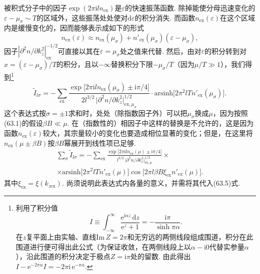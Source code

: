 被积式分子中的因子$\exp(2\pi\mathrm{i}ln_{\mathrm{ex}})$是$\varepsilon$的快速振荡函数. 除掉能使分母迅速变化的$\varepsilon-\mu_\sigma\sim T$的区域外，这些振荡处处使对$\mathrm{d}\varepsilon$的积分消失. 而函数$n_{\mathrm{ex}}(\varepsilon)$在这个区域内是缓慢变化的，因而能够表示成如下的形式
\begin{equation*}
n_{\mathrm{ex}}(\varepsilon)\approx n_{\mathrm{ex}}(\mu_\sigma)
+n'_{\mathrm{ex}}(\mu_\sigma)(\varepsilon-\mu_\sigma),
\end{equation*}
因子$|\partial^2 n/\partial k_z^2|_{\mathrm{ex}}^{-1/2}$可直接以其在$\varepsilon=\mu_\sigma$处之值来代替. 然后，由对$\varepsilon$的积分转到对$x=(\varepsilon-\mu_\sigma)/T$的积分，且以$-\infty$替换积分下限$-\mu_\sigma/T$（因为$\mu/T\gg1$），我们得到\footnote{利用了积分值
\begin{equation*}
 I\equiv\int_{-\infty}^{\infty}\frac{\mathrm e^{\mathrm i\alpha z}\,\mathrm dz}{\mathrm e^{z}+1}=-\frac{\mathrm i\pi}{\sinh\pi\alpha}.
\end{equation*}
在$z$复平面上由实轴、直线$\mathrm{Im}\,Z=2\pi$和无穷远的两侧线段组成围道，积分在此围道进行便可得出此公式（为保证收敛，在两侧线段上以$\alpha-\mathrm i0$代替实参量$\alpha$），沿此围道的积分决定于极点$Z=\mathrm i\pi$处的留数. 由此得出$I-\mathrm e^{-2\pi\alpha}I=-2\pi\mathrm i\,\mathrm e^{-\pi\alpha}$.}
\begin{equation*}
\tilde{I}_{l\sigma}=-\sum_{\mathrm{ex}}
\frac{\exp\bigl[2\pi\mathrm{i}ln_{\mathrm{ex}}(\mu_\sigma)\pm\mathrm{i}\pi/4\bigr]}
{2l^{3/2}\,\bigl|\partial^2 n/\partial k_z^2\bigr|_{\mathrm{ex},\mu_\sigma}^{1/2}}
\cdot\mathrm{arsinh}\bigl[2\pi^2lTn'_{\mathrm{ex}}(\mu_\sigma)\bigr].
\end{equation*}
这个表达式按$\sigma=\pm1$求和时，处处（除指数因子外）可以把$\mu_\sigma$换成$\mu$，因为按照(63.1)的假设$\beta B\ll\mu$. 在（指数性的）相因子中这样的替换是不允许的，这是因为函数$n_{\mathrm{ex}}(\varepsilon)$较大，其宗量较小的变化也要造成相位显著的变化；但是，在这里将$n_{\mathrm{ex}}(\mu\pm\beta B)$按$\beta B$幂展开到线性项已足够.
\begin{equation}
\begin{aligned}
\sum_{\sigma}\tilde{I}_{l\sigma}=-\sum_{\mathrm{ex}}
\frac{\exp\bigl[2\pi\mathrm{i}ln_{\mathrm{ex}}(\mu)\pm\mathrm{i}\pi/4\bigr]}
{l^{3/2}\,\bigl|\partial^2 n/\partial k_z^2\bigr|_{\mathrm{ex},\mu}^{1/2}}\times\\
\times\mathrm{arsinh}\bigl[2\pi^2lTn'_{\mathrm{ex}}(\mu)\bigr]
\cos\bigl[2\pi l\beta B\xi_{\mathrm{ex}}n'_{\mathrm{ex}}(\mu)\bigr].
\end{aligned}
\end{equation}
其中$\xi_{\mathrm{ex}}=\xi(k_{z\mathrm{ex}})$. 尚须说明此表达式内各量的意义，并需将其代入(63.5)式.


